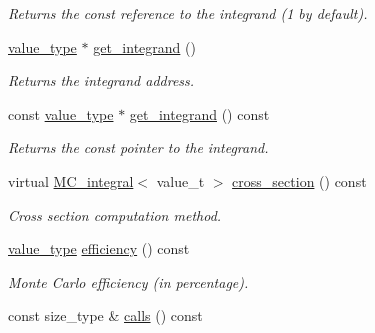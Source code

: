 \begin{DoxyCompactItemize}
\begin{DoxyCompactList}\small\item\em Returns the const reference to the integrand (1 by default). \end{DoxyCompactList}\item 
\hypertarget{a00362_a39dd7a8323bc405f47d01a71a34aaf12}{\hyperlink{a00362_a3353150105036deac9bde097cbf1d8af}{value\-\_\-type} $\ast$ \hyperlink{a00362_a39dd7a8323bc405f47d01a71a34aaf12}{get\-\_\-integrand} ()}\label{a00362_a39dd7a8323bc405f47d01a71a34aaf12}

\begin{DoxyCompactList}\small\item\em Returns the integrand address. \end{DoxyCompactList}\item 
\hypertarget{a00362_a5b640008b1bf69e0901819ebe1eb64b6}{const \hyperlink{a00362_a3353150105036deac9bde097cbf1d8af}{value\-\_\-type} $\ast$ \hyperlink{a00362_a5b640008b1bf69e0901819ebe1eb64b6}{get\-\_\-integrand} () const }\label{a00362_a5b640008b1bf69e0901819ebe1eb64b6}

\begin{DoxyCompactList}\small\item\em Returns the const pointer to the integrand. \end{DoxyCompactList}\item 
virtual \hyperlink{a00363}{M\-C\-\_\-integral}$<$ value\-\_\-t $>$ \hyperlink{a00362_a31ba36285b9baf167b23b39d33847039}{cross\-\_\-section} () const 
\begin{DoxyCompactList}\small\item\em Cross section computation method. \end{DoxyCompactList}\item 
\hypertarget{a00362_a6762cab4879eb696e4db070018c25831}{\hyperlink{a00362_a3353150105036deac9bde097cbf1d8af}{value\-\_\-type} \hyperlink{a00362_a6762cab4879eb696e4db070018c25831}{efficiency} () const }\label{a00362_a6762cab4879eb696e4db070018c25831}

\begin{DoxyCompactList}\small\item\em Monte Carlo efficiency (in percentage). \end{DoxyCompactList}\item 
\hypertarget{a00362_aef565b17cc2e9aa1ed6c083f4e079988}{const size\-\_\-type \& \hyperlink{a00362_aef565b17cc2e9aa1ed6c083f4e079988}{calls} () const }\label{a00362_aef565b17cc2e9aa1ed6c083f4e079988}


\end{DoxyCompactItemize}

